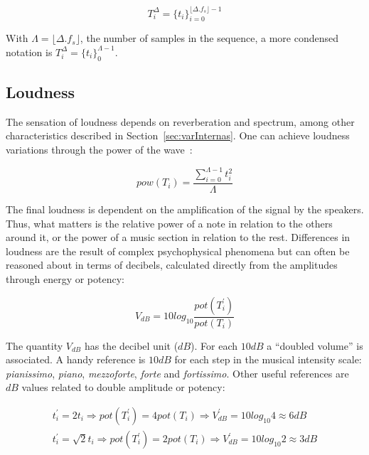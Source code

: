 \begin{equation}\label{eq:dur}
T_{i}^{\Delta}={\{t_i\}}_{i=0}^{\lfloor \Delta . f_s \rfloor -1}
\end{equation}

With $\Lambda=\lfloor \Delta . f_s \rfloor$, the number of samples in the sequence, a more condensed notation is $T_i^\Delta=\{t_i\}_0^{\Lambda-1}$.

\subsection{Loudness}\label{subsec:volume}
The sensation of loudness depends on reverberation and spectrum, among other characteristics described in Section~\ref{sec:varInternas}. One can achieve loudness variations through the power of the wave~\cite{Chowning}:

\begin{equation}\label{eq:potencia}
pow(T_i)=\frac{\sum_{i=0}^{\Lambda -1} t_i^2}{\Lambda}
\end{equation} 

The final loudness is dependent on the amplification of the signal by the speakers. Thus, what matters is the relative power of a note in relation to the others around it, or the power of a music section in relation to the rest. Differences in loudness are the result of complex psychophysical phenomena but can often be reasoned about in terms of decibels, calculated directly from the amplitudes through energy or potency:

\begin{equation}\label{decibels}
V_{dB}=10log_{10}\frac{pot(T^{'}_i)}{pot(T_i)}
\end{equation}

The quantity $V_{dB}$ has the decibel unit ($dB$). 
For each $10dB$ a ``doubled volume'' is associated.
A handy reference is $10dB$ for each step in the musical intensity scale: \emph{pianissimo}, \emph{piano}, \emph{mezzoforte}, \emph{forte} and \emph{fortissimo}. Other useful references are $dB$ values related to double amplitude or potency:

\begin{align}
t_i^{'}=2 t_i \Rightarrow pot(T^{'}_i)=4 pot(T_i) \Rightarrow V^{'}_{dB}=10log_{10} 4 \approx 6 dB \label{eq:ampVol}\\
t_i^{'}=\sqrt{2} t_i \Rightarrow pot(T^{'}_i)=2 pot(T_i) \Rightarrow V^{'}_{dB}=10log_{10} 2 \approx 3 dB\label{eq:potVol}
\end{align}

